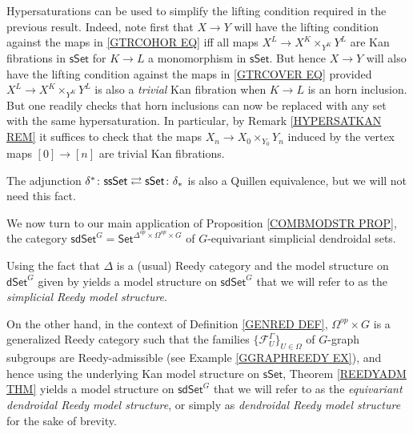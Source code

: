 \documentclass[a4paper,10pt,draft]{article}%
\numberwithin{equation}{section}%
\numberwithin{figure}{section}
\begin{document}
\begin{remark}\label{HYPERSIMPL REM}
	Hypersaturations can be used to simplify the lifting condition required in the previous result. 
	Indeed, note first that $X \to Y$ will have the lifting condition against the maps in \eqref{GTRCOHOR EQ} iff
	all maps $X^L \to X^K \times_{Y^K} Y^L$
	are Kan fibrations in $\mathsf{sSet}$ for $K\to L$ a monomorphism in $\mathsf{sSet}$.
	But hence $X \to Y$ will also have the lifting condition
	against the maps in \eqref{GTRCOVER EQ} provided 
	$X^L \to X^K \times_{Y^K} Y^L$ is also a \textit{trivial} Kan fibration when $K\to L$ is an horn inclusion.
	But one readily checks that horn inclusions can now be replaced with any set with the same hypersaturation. In particular, by Remark \ref{HYPERSATKAN REM} it suffices to check that the maps $X_n \to X_0 \times_{Y_0} Y_n$ induced by the vertex maps $[0] \to [n]$ are trivial Kan fibrations.
\end{remark}



\begin{remark}
The adjunction 
$
	\delta^{\**}\colon \mathsf{ssSet}
		\rightleftarrows 
	\mathsf{sSet} \colon \delta_{\**}
$
is also a Quillen equivalence, but we will not need this fact.
\end{remark}


We now turn to our main application of Proposition \ref{COMBMODSTR PROP}, the category 
$\mathsf{sdSet}^G = \mathsf{Set}^{\Delta^{op} \times \Omega^{op} \times G}$
of $G$-equivariant simplicial dendroidal sets.

Using the fact that $\Delta$ is a (usual) Reedy category
and the model structure on $\mathsf{dSet}^G$ given by 
\cite[Thm. 2.1]{Per17}
yields a model structure on $\mathsf{sdSet}^G$
that we will refer to as the \textit{simplicial Reedy model structure}.

On the other hand, in the context of Definition \ref{GENRED DEF},
$\Omega^{op} \times G$ is a generalized Reedy category such that the families $\{\mathcal{F}_{U}^{\Gamma}\}_{U \in \Omega}$
of $G$-graph subgroups are Reedy-admissible 
(see Example \ref{GGRAPHREEDY EX}), 
and hence using the underlying 
Kan model structure on $\mathsf{sSet}$, 
Theorem \ref{REEDYADM THM} yields
a model structure on $\mathsf{sdSet}^G$
that we will refer to as the \textit{equivariant dendroidal Reedy model structure}, 
or simply as \textit{dendroidal Reedy model structure} for the sake of brevity.
\end{document}

